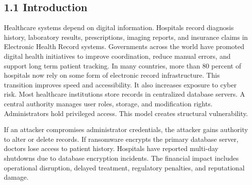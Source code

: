 \subsection*{1.1 Introduction}
Healthcare systems depend on digital information. Hospitals record diagnosis history, laboratory results, prescriptions, imaging reports, and insurance claims in Electronic Health Record systems. Governments across the world have promoted digital health initiatives to improve coordination, reduce manual errors, and support long term patient tracking. In many countries, more than 80 percent of hospitals now rely on some form of electronic record infrastructure. This transition improves speed and accessibility. It also increases exposure to cyber risk.
Most healthcare institutions store records in centralized database servers. A central authority manages user roles, storage, and modification rights. Administrators hold privileged access. This model creates structural vulnerability.

If an attacker compromises administrator credentials, the attacker gains authority to alter or delete records. If ransomware encrypts the primary database server, doctors lose access to patient history. Hospitals have reported multi-day shutdowns due to database encryption incidents. The financial impact includes operational disruption, delayed treatment, regulatory penalties, and reputational damage.


